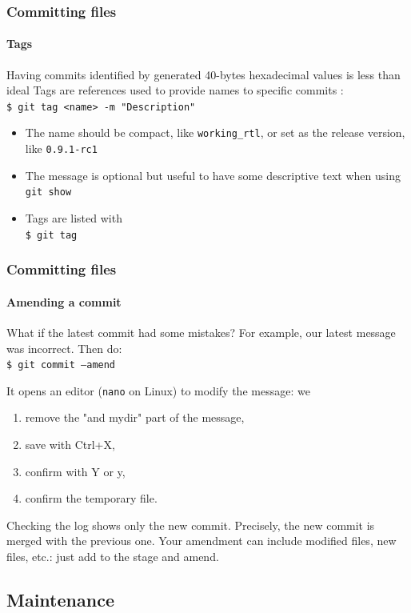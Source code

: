 \begin{frame}
\frametitle{Committing files}
\framesubtitle{Tags}

\begin{block}{Having commits identified by generated 40-bytes hexadecimal values is less than ideal}
Tags are references used to provide names to specific commits : \\
\texttt{\$ git tag <name> -m "Description"} \\

\medskip
\begin{itemize}
\item The name should be compact, like \texttt{working\_rtl}, or set as the release version, like \texttt{0.9.1-rc1}
\item The message is optional but useful to have some descriptive text when using \texttt{git show}
\item Tags are listed with \\
\texttt{\$ git tag}
\end{itemize}
\end{block}
\end{frame}

\begin{frame}
\frametitle{Committing files}
\framesubtitle{Amending a commit}

\begin{block}{What if the latest commit had some mistakes?}
For example, our latest message was incorrect. Then do: \\
\texttt{\$ git commit ---amend}

\medskip
It opens an editor (\texttt{nano} on Linux) to modify the message: we 
\begin{enumerate}
\item remove the "and mydir" part of the message,
\item save with Ctrl+X,
\item confirm with Y or y,
\item confirm the temporary file.
\end{enumerate}
Checking the log shows only the new commit. Precisely, the new commit is merged with the previous one. Your amendment can include modified files, new files, etc.: just add to the stage and amend.
\end{block}
\end{frame}

\subsection{Maintenance}

